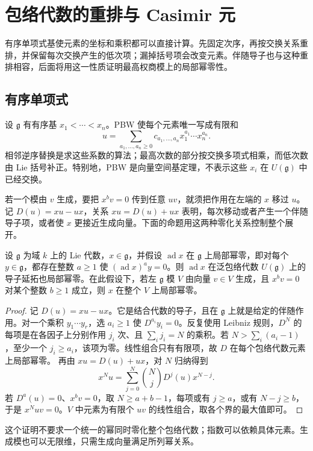 
\section{包络代数的重排与 Casimir 元}
\label{b5:sec:1503}


%
%

有序单项式基使元素的坐标和乘积都可以直接计算。先固定次序，再按交换关系重排，并保留每次交换产生的低次项；漏掉括号项会改变元素。伴随导子也与这种重排相容，后面将用这一性质证明最高权商模上的局部幂零性。

\subsection{有序单项式}
\label{b5:subsec:1503:01}

设 \(\mathfrak g\) 有有序基 \(x_1<\cdots<x_n\)。PBW 使每个元素唯一写成有限和
\[
	u=\sum_{a_1,\ldots,a_n\ge0} c_{a_1,\ldots,a_n}x_1^{a_1}\cdots x_n^{a_n}.
\]
相邻逆序替换是求这些系数的算法；最高次数的部分按交换多项式相乘，而低次数由 Lie 括号补正。特别地，PBW 是向量空间基定理，不表示这些 \(x_i\) 在 \(U(\mathfrak g)\) 中已经交换。

\ProseParagraphBreak
若一个模由 \(v\) 生成，要把 \(x^bv=0\) 传到任意 \(uv\)，就须把作用在左端的 \(x\) 移过 \(u\)。记 \(D(u)=xu-ux\)，关系 \(xu=D(u)+ux\) 表明，每次移动或者产生一个伴随导子项，或者使 \(x\) 更接近生成向量。下面的命题用这两种零化关系控制整个展开。

\begin{proposition}\label{b5:prop:enveloping-adjoint-nilpotence}
	设 \(\mathfrak g\) 为域 \(k\) 上的 Lie 代数，\(x\in\mathfrak g\)，并假设 \(\operatorname{ad}x\) 在 \(\mathfrak g\) 上局部幂零，即对每个 \(y\in\mathfrak g\)，都存在整数 \(a\ge1\) 使 \((\operatorname{ad}x)^a y=0\)。则 \(\operatorname{ad}x\) 在泛包络代数 \(U(\mathfrak g)\) 上的导子延拓也局部幂零。在此假设下，若左 \(\mathfrak g\) 模 \(V\) 由向量 \(v\in V\) 生成，且 \(x^b v=0\) 对某个整数 \(b\ge1\) 成立，则 \(x\) 在整个 \(V\) 上局部幂零。
\end{proposition}
\begin{proof}
	记 \(D(u)=xu-ux\)。它是结合代数的导子，且在 \(\mathfrak g\) 上就是给定的伴随作用。对一个乘积 \(y_1\cdots y_r\)，选 \(a_i\ge1\) 使 \(D^{a_i}y_i=0\)。反复使用 Leibniz 规则，\(D^N\) 的每项是在各因子上分别作用 \(j_i\) 次、且 \(\sum_i j_i=N\) 的乘积。若 \(N>\sum_i(a_i-1)\)，至少一个 \(j_i\ge a_i\)，该项为零。线性组合只有有限项，故 \(D\) 在每个包络代数元素上局部幂零。 再由 \(xu=D(u)+ux\)，对 \(N\) 归纳得到
	\[
		x^Nu=\sum_{j=0}^N\binom NjD^j(u)x^{N-j}.
	\]
	若 \(D^a(u)=0\)、\(x^bv=0\)，取 \(N\ge a+b-1\)，每项或有 \(j\ge a\)，或有 \(N-j\ge b\)，于是 \(x^Nuv=0\)。\(V\) 中元素为有限个 \(uv\) 的线性组合，取各个界的最大值即可。
\end{proof}
这个证明不要求一个统一的幂同时零化整个包络代数；指数可以依赖具体元素。生成模也可以无限维，只需生成向量满足所列幂关系。

